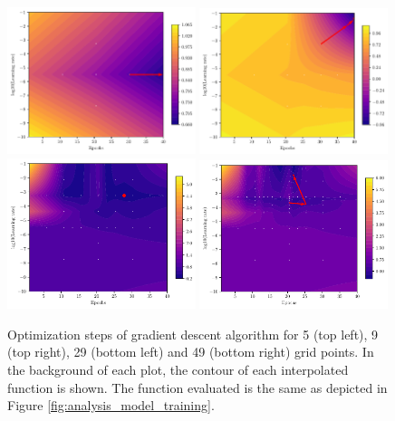 \begin{figure}[htbp!]
	\centering
	\includegraphics[width=0.49\textwidth]{figures/Results/Machine_learning/optimizer/Optimizers_visualization_ml_5}
	\includegraphics[width=0.49\textwidth]{figures/Results/Machine_learning/optimizer/Optimizers_visualization_ml_10}
	\includegraphics[width=0.49\textwidth]{figures/Results/Machine_learning/optimizer/Optimizers_visualization_ml_30}
	\includegraphics[width=0.49\textwidth]{figures/Results/Machine_learning/optimizer/Optimizers_visualization_ml_50}
	
	\caption{ Optimization steps of gradient descent algorithm for 5 (top left), 9 (top right), 29 (bottom left) and 49 (bottom right) grid points. In the background of each plot, the contour of each interpolated function is shown. The function evaluated is the same as depicted in Figure \ref{fig:analysis_model_training}. }
	\label{fig:optimizers_network_visualization}
\end{figure}

